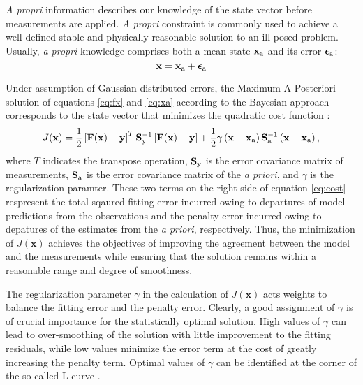  \textit{A propri} information describes our knowledge of the state vector before measurements
 are applied. \textit{A propri} constraint is commonly used to achieve a well-defined stable
 and physically reasonable solution to an ill-posed problem. Usually, \textit{a propri}
 knowledge comprises both a mean state $\mathbf{x}_\text{a}$ and its error
 $\boldsymbol{\epsilon}_\text{a}$:
 \begin{equation} \label{eq:xa}
  \mathbf{x} = \mathbf{x}_\text{a} + \boldsymbol{\epsilon}_\text{a}
 \end{equation}

 Under assumption of Gaussian-distributed errors, the Maximum A Posteriori solution of
  equations \eqref{eq:fx} and \eqref{eq:xa} according to the Bayesian approach
 corresponds to the state vector that minimizes the quadratic cost function
 \citep{rodgers00}:
 \begin{equation} \label{eq:cost}
 J(\mathbf{x}) = \frac{1}{2} \left[ \mathbf{F(x)-y}\right]^T
                 \mathbf{S}_\text{y}^{-1} \left[ \mathbf{F(x)-y}\right]
               + \frac{1}{2} \gamma \left( \mathbf{x}-\mathbf{x}_\text{a} \right)
                 \mathbf{S}_\text{a}^{-1} \left( \mathbf{x}-\mathbf{x}_\text{a} \right) \mbox{,}
 \end{equation}
 where $T$ indicates the transpose operation, $\mathbf{S}_\text{y}$ is the error covariance matrix
 of measurements, $\mathbf{S}_\text{a}$ is the error covariance matrix of the \textit{a priori},
 and $\gamma$ is the regularization paramter. These two terms on the right side of
 equation \eqref{eq:cost} respresent the total sqaured fitting error incurred owing
 to departures of model predictions from the observations and the penalty error
 incurred owing to depatures of the estimates from the \textit{a priori}, respectively.
 Thus, the minimization of $J(\mathbf{x})$ achieves the objectives of improving the
 agreement between the model and the measurements while ensuring that the solution
 remains within a reasonable range and degree of smoothness.

 The regularization parameter $\gamma$ in the calculation of $J(\mathbf{x})$ acts weights
 to balance the fitting error and the penalty error. Clearly, a good assignment of
 $\gamma$ is of crucial importance for the statistically optimal solution. High values
 of $\gamma$ can lead to over-smoothing of the solution with little improvement to the
 fitting residuals, while low values minimize the error term at the cost of greatly
 increasing the penalty term. Optimal values of $\gamma$ can be identified at the
 corner of the so-called L-curve \citep{hansen98}.

